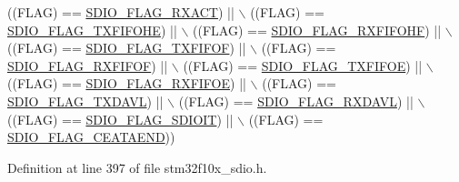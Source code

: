 \begin{DoxyCode}
                            ((FLAG)  == \hyperlink{group___s_d_i_o___flags_gacc935dd830338970890a05922dff8ab7}{SDIO\_FLAG\_RXACT}) || \(\backslash\)
                            ((FLAG)  == \hyperlink{group___s_d_i_o___flags_gae9277461d3c8984dc31af318e2df1959}{SDIO\_FLAG\_TXFIFOHE}) || \(\backslash\)
                            ((FLAG)  == \hyperlink{group___s_d_i_o___flags_ga8c5942ae3df21efad2d7c61a46015758}{SDIO\_FLAG\_RXFIFOHF}) || \(\backslash\)
                            ((FLAG)  == \hyperlink{group___s_d_i_o___flags_gad3ca936300ef251639a4cfbe2f63b6b8}{SDIO\_FLAG\_TXFIFOF}) || \(\backslash\)
                            ((FLAG)  == \hyperlink{group___s_d_i_o___flags_gaf92cb783f000b8d946fe8ace81b51df2}{SDIO\_FLAG\_RXFIFOF}) || \(\backslash\)
                            ((FLAG)  == \hyperlink{group___s_d_i_o___flags_gac41ef05773abad79b4b0c443a77733db}{SDIO\_FLAG\_TXFIFOE}) || \(\backslash\)
                            ((FLAG)  == \hyperlink{group___s_d_i_o___flags_ga59ea7e2dc22df742053c5e525b98599d}{SDIO\_FLAG\_RXFIFOE}) || \(\backslash\)
                            ((FLAG)  == \hyperlink{group___s_d_i_o___flags_ga9c6620d6b16b6af19d3e14f40e688631}{SDIO\_FLAG\_TXDAVL}) || \(\backslash\)
                            ((FLAG)  == \hyperlink{group___s_d_i_o___flags_ga7558b354658171bb6aa1b6f1e16d8e21}{SDIO\_FLAG\_RXDAVL}) || \(\backslash\)
                            ((FLAG)  == \hyperlink{group___s_d_i_o___flags_gae888ec1c9885c35a5f8e01bcffe324a1}{SDIO\_FLAG\_SDIOIT}) || \(\backslash\)
                            ((FLAG)  == \hyperlink{group___s_d_i_o___flags_ga3c8d09a405944948e7a1c5493d49aff1}{SDIO\_FLAG\_CEATAEND}))
\end{DoxyCode}


Definition at line 397 of file stm32f10x\+\_\+sdio.\+h.

